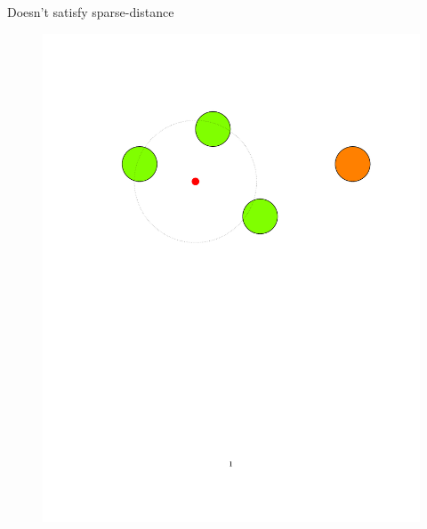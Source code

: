 \documentclass{beamer}
\begin{document}
\begin{frame}{Doesn't satisfy sparse-distance}   
   \begin{figure}
	  \includegraphics[trim = 100 0 0 100, clip, width=\linewidth]{4.pdf}
   \end{figure}
\end{frame}
\end{document}
